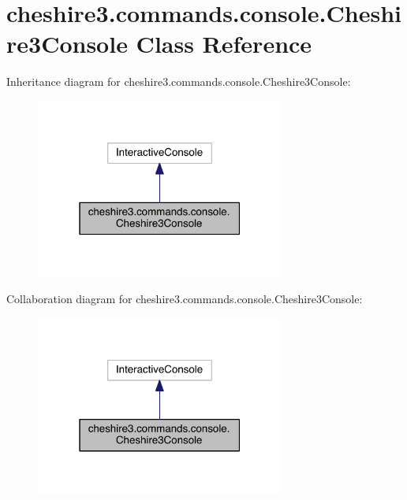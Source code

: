 \hypertarget{classcheshire3_1_1commands_1_1console_1_1_cheshire3_console}{\section{cheshire3.\-commands.\-console.\-Cheshire3\-Console Class Reference}
\label{classcheshire3_1_1commands_1_1console_1_1_cheshire3_console}
}


Inheritance diagram for cheshire3.\-commands.\-console.\-Cheshire3\-Console\-:
\nopagebreak
\begin{figure}[H]
\begin{center}
\leavevmode
\includegraphics[width=232pt]{classcheshire3_1_1commands_1_1console_1_1_cheshire3_console__inherit__graph}
\end{center}
\end{figure}


Collaboration diagram for cheshire3.\-commands.\-console.\-Cheshire3\-Console\-:
\nopagebreak
\begin{figure}[H]
\begin{center}
\leavevmode
\includegraphics[width=232pt]{classcheshire3_1_1commands_1_1console_1_1_cheshire3_console__coll__graph}
\end{center}
\end{figure}
